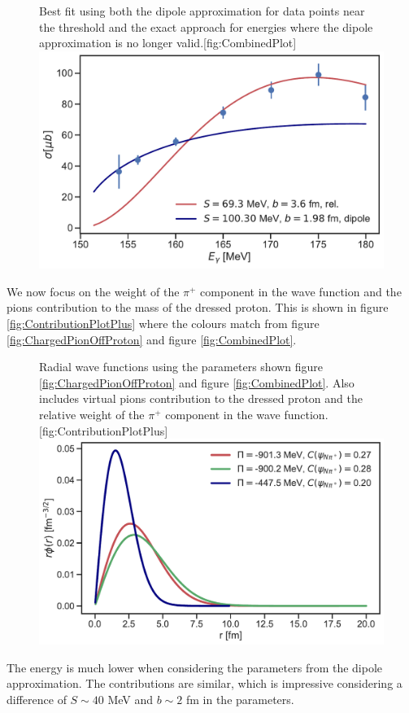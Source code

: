 \begin{figure}[H]
	\begin{sidecaption}{Best fit using both the dipole approximation for data points near the threshold and the exact approach for energies where the dipole approximation is no longer valid.}[fig:CombinedPlot]
		\includegraphics[width=\linewidth]{Figures/ChargedPionOffProtonExact1.pdf}
	\end{sidecaption}
\end{figure}
We now focus on the weight of the $\pi^+$ component in the wave function and the pions contribution to the mass of the dressed proton. This is shown in figure \ref{fig:ContributionPlotPlus} where the colours match from figure \ref{fig:ChargedPionOffProton} and figure \ref{fig:CombinedPlot}.
\begin{figure}[H]
	\begin{sidecaption}{Radial wave functions using the parameters shown figure \ref{fig:ChargedPionOffProton} and figure \ref{fig:CombinedPlot}. Also includes virtual pions contribution to the dressed proton and the relative weight of the $\pi^+$ component in the wave function.}[fig:ContributionPlotPlus]
		\includegraphics[width=\linewidth]{Figures/ContributionPlotPiPlus.pdf}
	\end{sidecaption}
\end{figure}
The energy is much lower when considering the parameters from the dipole approximation. The contributions are similar, which is impressive considering a difference of $S \sim  40$ MeV and $b\sim2$ fm in the parameters. 

